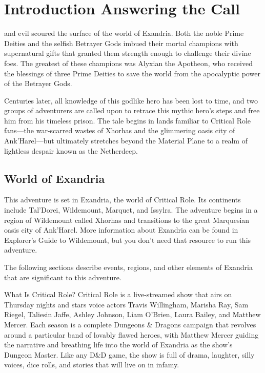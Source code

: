 \documentclass[10pt,a4paper,twoside,twocolumn,openany,nodeprecatedcode]{dndbook}
\begin{document}
\tableofcontents
\newpage

\chapter*{Introduction \textendash{} Answering the Call}


 and evil scoured the surface of the world of Exandria. Both the noble Prime Deities and the selfish Betrayer Gods imbued their mortal champions with supernatural gifts that granted them strength enough to challenge their divine foes. The greatest of these champions was Alyxian the Apotheon, who received the blessings of three Prime Deities to save the world from the apocalyptic power of the Betrayer Gods.

Centuries later, all knowledge of this godlike hero has been lost to time, and two groups of adventurers are called upon to retrace this mythic hero's steps and free him from his timeless prison. The tale begins in lands familiar to Critical Role fans—the war-scarred wastes of Xhorhas and the glimmering oasis city of Ank'Harel—but ultimately stretches beyond the Material Plane to a realm of lightless despair known as the Netherdeep.

\section{World of Exandria}
This adventure is set in Exandria, the world of Critical Role. Its continents include Tal'Dorei, Wildemount, Marquet, and Issylra. The adventure begins in a region of Wildemount called Xhorhas and transitions to the great Marquesian oasis city of Ank'Harel. More information about Exandria can be found in Explorer's Guide to Wildemount, but you don't need that resource to run this adventure.

The following sections describe events, regions, and other elements of Exandria that are significant to this adventure.

\begin{DndSidebar}[float=!b]{What Is Critical Role?}
Critical Role is a live-streamed show that airs on Thursday nights and stars voice actors Travis Willingham, Marisha Ray, Sam Riegel, Taliesin Jaffe, Ashley Johnson, Liam O'Brien, Laura Bailey, and Matthew Mercer. Each season is a complete Dungeons \& Dragons campaign that revolves around a particular band of lovably flawed heroes, with Matthew Mercer guiding the narrative and breathing life into the world of Exandria as the show's Dungeon Master. Like any D\&D game, the show is full of drama, laughter, silly voices, dice rolls, and stories that will live on in infamy.
\end{DndSidebar}
\end{document}

